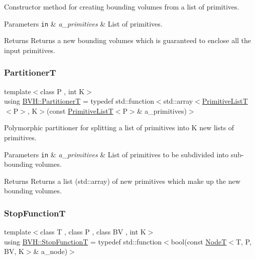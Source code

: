 Constructor method for creating bounding volumes from a list of primitives. 


\begin{DoxyParams}[1]{Parameters}
\mbox{\tt in}  & {\em a\+\_\+primitives} & List of primitives. \\
\hline
\end{DoxyParams}
\begin{DoxyReturn}{Returns}
Returns a new bounding volumes which is guaranteed to enclose all the input primitives. 
\end{DoxyReturn}
\mbox{\label{namespaceBVH_a7c33d54da9893d506709b2ca96b76f55}} 
\subsubsection{\texorpdfstring{PartitionerT}{PartitionerT}}
{\footnotesize\ttfamily template$<$class P , int K$>$ \\
using \hyperlink{namespaceBVH_a7c33d54da9893d506709b2ca96b76f55}{B\+V\+H\+::\+PartitionerT} = typedef std\+::function$<$std\+::array$<$\hyperlink{namespaceBVH_aa1e753bda451b85cd5b948722a2ad7c7}{Primitive\+ListT}$<$P$>$, K$>$(const \hyperlink{namespaceBVH_aa1e753bda451b85cd5b948722a2ad7c7}{Primitive\+ListT}$<$P$>$\& a\+\_\+primitives)$>$}



Polymorphic partitioner for splitting a list of primitives into K new lists of primitives. 


\begin{DoxyParams}[1]{Parameters}
\mbox{\tt in}  & {\em a\+\_\+primitives} & List of primitives to be subdivided into sub-\/bounding volumes. \\
\hline
\end{DoxyParams}
\begin{DoxyReturn}{Returns}
Returns a list (std\+::array) of new primitives which make up the new bounding volumes. 
\end{DoxyReturn}
\mbox{\label{namespaceBVH_afef1c5979c34a11d23b756cc09654bf9}} 
\subsubsection{\texorpdfstring{Stop\+FunctionT}{StopFunctionT}}
{\footnotesize\ttfamily template$<$class T , class P , class BV , int K$>$ \\
using \hyperlink{namespaceBVH_afef1c5979c34a11d23b756cc09654bf9}{B\+V\+H\+::\+Stop\+FunctionT} = typedef std\+::function$<$bool(const \hyperlink{classBVH_1_1NodeT}{NodeT}$<$T, P, BV, K$>$\& a\+\_\+node)$>$}



